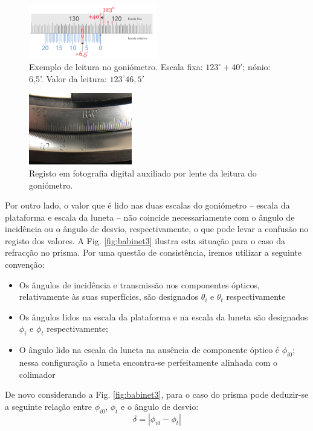 \documentclass[a4paper,twoside,11pt]{report}      %
\begin{document}
\begin{figure}[h]
	\centering 
	\includegraphics[width=0.5\textwidth]{gonio-nonio2}
	\caption{Exemplo de leitura no goniómetro. Escala fixa: $123^\circ+40'$; nónio: 6,5'. Valor da leitura: $123^\circ46,5'$
	\label{fig:gonio-nonio2}} 
\end{figure}

\begin{figure}[h]
	\centering 
	\includegraphics[width=0.4\textwidth]{gonio-lente}
	\caption{Registo em fotografia digital auxiliado por lente da leitura do goniómetro.
	\label{fig:gonio-lente}}
\end{figure}

Por outro lado, o valor que é lido nas duas escalas do goniómetro – escala da plataforma e escala da luneta – não coincide necessariamente com o ângulo de incidência ou o ângulo de desvio, respectivamente, o que pode levar a confusão no registo dos valores. A Fig. \ref{fig:babinet3} ilustra esta situação para o caso da refracção no prisma. Por uma questão de consistência, iremos utilizar a seguinte convenção:

\begin{itemize}
\item Os ângulos de incidência e transmissão nos componentes ópticos, relativamente às suas superfícies, são designados $\theta_i$ e $\theta_t$ respectivamente
\item Os ângulos lidos na escala da plataforma e na escala da luneta são designados $\phi_i$ e $\phi_t$ respectivamente; 
\item O ângulo lido na escala da luneta na ausência de componente óptico é $\phi_{i0}$; nessa configuração a luneta encontra-se perfeitamente alinhada com o colimador
\end{itemize}

De novo considerando a Fig. \ref{fig:babinet3}, para o caso do prisma pode deduzir-se a seguinte relação entre $\phi_{i0}$, $\phi_t$ e o ângulo de desvio:
\begin{equation}
\delta=|\phi_{i0}-\phi_t |
\end{equation}
\end{document}
